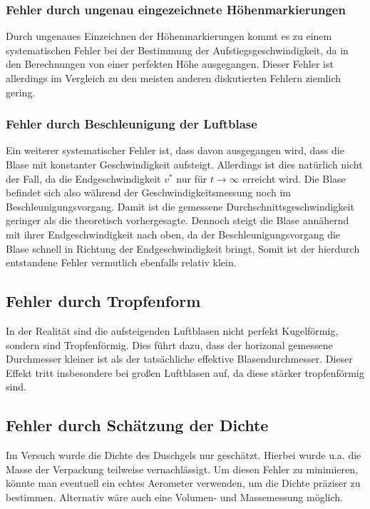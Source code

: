 \documentclass{report}
\begin{document}
\subsubsection{Fehler durch ungenau eingezeichnete Höhenmarkierungen}
Durch ungenaues Einzeichnen der Höhenmarkierungen kommt es zu einem systematischen Fehler bei der Bestimmung der Aufstiegsgeschwindigkeit, da in den Berechnungen von
einer perfekten Höhe ausgegangen. Dieser Fehler ist allerdings im Vergleich zu den meisten anderen diskutierten Fehlern ziemlich gering.
\subsubsection{Fehler durch Beschleunigung der Luftblase}
Ein weiterer systematischer Fehler ist, dass davon ausgegangen wird, dass die Blase mit konstanter Geschwindigkeit aufsteigt. Allerdings ist dies natürlich nicht der 
Fall, da die Endgeschwindigkeit $v^*$ nur für $t\to \infty$ erreicht wird. Die Blase befindet sich also während der Geschwindigkeitsmessung noch im Beschleunigungsvorgang.
Damit ist die gemessene Durchschnittsgeschwindigkeit geringer als die theoretisch vorhergesagte. Dennoch steigt die Blase annähernd mit ihrer Endgeschwindigkeit nach oben, da der Beschleunigungsvorgang
die Blase schnell in Richtung der Endgeschwindigkeit bringt. Somit ist der hierdurch entstandene Fehler vermutlich ebenfalls relativ klein.
\subsection{Fehler durch Tropfenform}
In der Realität sind die aufsteigenden Luftblasen nicht perfekt Kugelförmig, sondern sind Tropfenförmig. Dies führt dazu, dass der horizonal gemessene Durchmesser kleiner
ist als der tatsächliche effektive Blasendurchmesser. Dieser Effekt tritt insbesondere bei großen Luftblasen auf, da diese stärker tropfenförmig sind. 
\subsection{Fehler durch Schätzung der Dichte}
Im Versuch wurde die Dichte des Duschgels nur geschätzt. Hierbei wurde u.a. die Masse der Verpackung teilweise vernachlässigt. Um diesen Fehler zu minimieren, 
könnte man eventuell ein echtes Aerometer verwenden, um die Dichte präziser zu bestimmen. Alternativ wäre auch eine Volumen- und Massemessung möglich.
\end{document}
